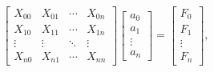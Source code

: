 \[\begin{bmatrix}X_{00}&X_{01}&\cdots&X_{0n}\\
X_{10}&X_{11}&\cdots&X_{1n}\\
\vdots&\vdots&\ddots&\vdots\\
X_{n0}&X_{n1}&\cdots&X_{nn}\end{bmatrix}\begin{bmatrix}a_{0}\\
a_{1}\\
\vdots\\
a_{n}\end{bmatrix}=\begin{bmatrix}F_{0}\\
F_{1}\\
\vdots\\
F_{n}\end{bmatrix},\]